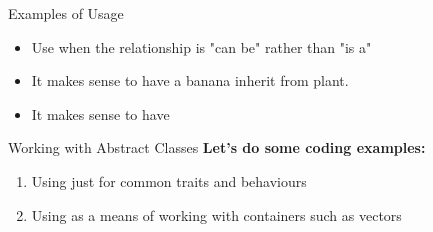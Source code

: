 \documentclass[10pt,xcolor={table,dvipsnames},t]{beamer}
\begin{document}
\begin{frame}[c]{Examples of Usage}
\begin{itemize}
	\item Use when the relationship is "can be" rather than "is a"
	\item It makes sense to have a banana inherit from plant.
	\item It makes sense to have 
\end{itemize}

\end{frame}
\begin{frame}[c]{Working with Abstract Classes}
\large
\textbf{Let's do some coding examples:}
\begin{enumerate}
	\item Using just for common traits and behaviours
	\item Using as a means of working with containers such as vectors
\end{enumerate}

\end{frame}
\end{document}
